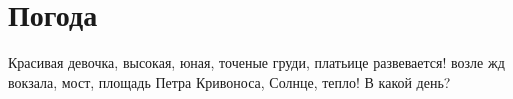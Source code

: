  
 
 
 
 

\chapter{Погода}


Красивая девочка, высокая, юная, точеные груди, платьице развевается!  возле жд
вокзала, мост, площадь Петра Кривоноса, Солнце, тепло! В какой день? 


